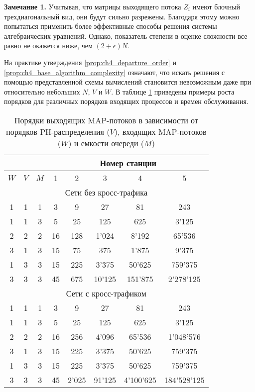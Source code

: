 \textbf{Замечание 1.} Учитывая, что матрицы выходящего потока $Z_i$ имеют блочный трехдиагональный вид, они будут сильно разрежены. Благодаря этому можно попытаться применить более эффективные способы решения системы алгебраических уравнений. Однако, показатель степени в оценке сложности все равно не окажется ниже, чем $(2 + \epsilon) N$.


На практике утверждения \ref{prop:ch4_departure_order} и \ref{prop:ch4_base_algorithm_complexity} означают, что искать решения с помощью представленной схемы вычислений становится невозможным даже при относительно небольших $N$, $V$ и $W$. В таблице \ref{table:ch4_map_order_growth} приведены примеры роста порядков для различных порядков входящих процессов и времен обслуживания.

\begin{table}[h!]
\centering
\begin{tabular}{ |c|c|c||c|c|c|c|c| }
\hline
\multicolumn{3}{|c||}{} & \multicolumn{5}{c|}{Номер станции} \\
\hline
$W$ & $V$ & $M$ & 1 & 2 & 3 & 4 & 5\\
\hline
\multicolumn{8}{|c|}{Сети без кросс-трафика} \\
\hline
1 & 1 & 1 & 3 & 9 & 27 & 81 & 243 \\
1 & 1 & 3 & 5 & 25 & 125 & 625 & 3'125 \\
2 & 2 & 2 & 16 & 128 & 1'024 & 8'192 & 65'536 \\
3 & 1 & 3 & 15 & 75 & 375 & 1'875 & 9'375 \\
1 & 3 & 3 & 15 & 225 & 3'375 & 50'625 & 759'375 \\
3 & 3 & 3 & 45 & 675 & 10'125 & 151'875 & 2'278'125 \\
\hline
\multicolumn{8}{|c|}{Сети с кросс-трафиком} \\
\hline
1 & 1 & 1 & 3 & 9 & 27 & 81 & 243 \\
1 & 1 & 3 & 5 & 25 & 125 & 625 & 3'125 \\
2 & 2 & 2 & 16 & 256 & 4'096 & 65'536 & 1'048'576 \\
3 & 1 & 3 & 15 & 225 & 3'375 & 50'625 & 759'375 \\
1 & 3 & 3 & 15 & 225 & 3'375 & 50'625 & 759'375 \\
3 & 3 & 3 & 45 & 2'025 & 91'125 & 4'100'625 & 184'528'125 \\
\hline
\end{tabular}
\caption{Порядки выходящих MAP-потоков в зависимости от порядков PH-распределения ($V$), входящих MAP-потоков ($W$) и емкости очереди ($M$)\label{table:ch4_map_order_growth}
}
\end{table}


